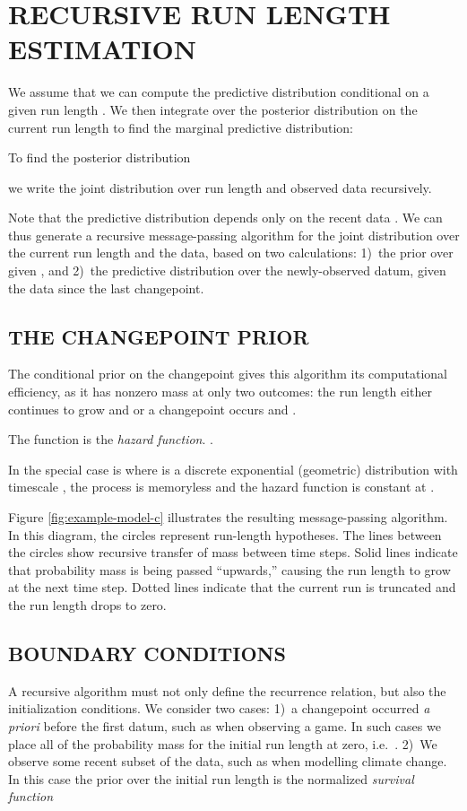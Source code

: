 \documentclass[]{article}
\begin{document}
  \section{RECURSIVE RUN LENGTH ESTIMATION}
    We assume that we can compute the predictive distribution conditional
    on a given run length .  We then integrate over the posterior
    distribution on the current run length to find the marginal predictive
    distribution:
    

    To find the posterior distribution
    
    we write the joint distribution over run length and observed data
    recursively.
    
    Note that the predictive distribution  depends only on the recent data .  We can
    thus generate a recursive message-passing algorithm for the joint
    distribution over the current run length and the data, based on two
    calculations: 1)~the prior over  given , and 2)~the
    predictive distribution over the newly-observed datum, given the data
    since the last changepoint.

    \subsection{THE CHANGEPOINT PRIOR}
      The conditional prior on the changepoint 
      gives this algorithm its computational efficiency, as it has nonzero
      mass at only two outcomes: the run length either continues to grow
      and  or a changepoint occurs and .
      
      The function  is the \textit{hazard function}.
      \cite{evans-etal-2000a}.
      
      In the special case is where  is a discrete
      exponential (geometric) distribution with timescale , the
      process is memoryless and the hazard function is constant at
      .

      Figure \ref{fig:example-model-c} illustrates the resulting
      message-passing algorithm.  In this diagram, the circles represent
      run-length hypotheses.  The lines between the circles show recursive
      transfer of mass between time steps.  Solid lines indicate that
      probability mass is being passed ``upwards,'' causing the run length
      to grow at the next time step.  Dotted lines indicate that the
      current run is truncated and the run length drops to zero.
      
    \subsection{BOUNDARY CONDITIONS}
      A recursive algorithm must not only define the recurrence relation,
      but also the initialization conditions.  We consider two cases: 1)~a
      changepoint occurred \textit{a priori} before the first datum, such
      as when observing a game.  In such cases we place all of the
      probability mass for the initial run length at zero, i.e.\
      .  2)~We observe some recent subset of the
      data, such as when modelling climate change.  In this case the prior
      over the initial run length is the normalized \textit{survival
      function} \cite{evans-etal-2000a}
      
\end{document}
